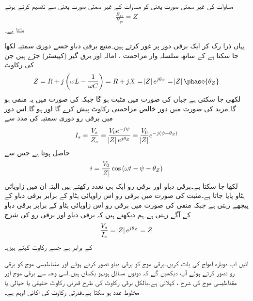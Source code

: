 مساوات  کی غیر سمتی صورت یعنی  کو مساوات  کے غیر سمتی صورت یعنی  سے تقسیم کرتے ہوئے
\begin{align}
\frac{E_{xs}}{H_{ys}}=Z
\end{align}
ملتا ہے۔

یہاں ذرا رک کر ایک برقی دور پر غور کرتے ہیں۔منبع برقی دباو  جسے دوری سمتیہ  لکھا جا سکتا ہے کے ساتھ سلسلہ وار مزاحمت ، امالہ  اور برق گیر (کپیسٹر)   جڑے ہیں جن کی رکاوٹ 
\begin{align*}
Z=R+j\left( \omega L -\frac{1}{\omega C}\right)=R+jX=\abs{Z} e^{j \theta_Z}=\abs{Z}\phase{\theta_Z}
\end{align*}
لکھی جا سکتی ہے  جہاں  کی صورت میں  مثبت ہو گا جبکہ  کی صورت میں یہ منفی ہو گا۔مزید  کی صورت میں دور خالص مزاحمتی رکاوٹ پیش کرے گا اور  ہو گا۔اس دور میں برقی رو دوری سمتیہ کی مدد سے
\begin{align*}
I_s=\frac{V_s}{Z_s}=\frac{V_0 e^{-j\psi}}{\abs{Z}e^{j \theta_Z}}=\frac{V_0}{\abs{Z}}e^{-j(\psi+\theta_Z)}
\end{align*}
حاصل ہوتا ہے جس سے
\begin{align*}
i=\frac{V_0}{\abs{Z}}\cos \left(\omega t -\psi-\theta_Z \right)
\end{align*}
لکھا جا سکتا ہے۔برقی دباو اور برقی رو ایک ہی تعدد رکھتے ہیں البتہ ان میں زاویائی ہٹاو  پایا جاتا ہے۔مثبت  کی صورت میں برقی رو اس زاویائی ہٹاو کے برابر برقی دباو کے پیچھے رہتی ہے جبکہ منفی  کی صورت میں برقی رو اس زاویائی ہٹاو کے برابر برقی دباو کے آگے رہتی ہے۔ہم دیکھتے ہیں کہ برقی دباو اور برقی رو کی شرح
\begin{align*}
\frac{V_s}{I_s}=\abs{Z} e^{j \theta_Z}=Z
\end{align*}
کے برابر ہے جسے رکاوٹ کہتے ہیں۔

آئیں اب دوبارہ امواج کی بات کریں۔برقی موج کو برقی دباو تصور کرتے ہوئے اور مقناطیسی موج کو برقی رو تصور کرتے ہوئے آپ دیکھیں گے کہ دونوں مسائل ہوبہو یکساں ہیں۔اسی وجہ سے  برقی موج  اور مقناطیسی موج  کی شرح ،   کہلاتی ہے۔بالکل برقی رکاوٹ کی طرح قدرتی رکاوٹ حقیقی یا خیالی یا مخلوط عدد ہو سکتا ہے۔قدرتی رکاوٹ کی اکائی اوہم  ہے۔

